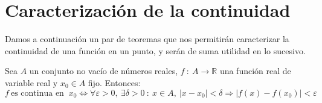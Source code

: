 
\section{Caracterización de la continuidad}
Damos a continuación un par de teoremas que nos permitirán caracterizar la continuidad de una función en un punto, y serán de suma utilidad en lo sucesivo.

\begin{teo}\label{teo:12.4.1}
    Sea $A$ un conjunto no vacío de números reales, $f ~:~ A \longrightarrow \mathbb{R}$ una función real de variable real y $x_0 \in A$ fijo. Entonces:
    \begin{equation*}
        f ~ \text{es continua en } ~ x_0 \Longleftrightarrow \forall \varepsilon > 0, ~ \exists \delta > 0 ~:~ x \in A, ~ |x-x_0| < \delta \Longrightarrow |f(x)-f(x_0)| < \varepsilon
    \end{equation*}
\end{teo}
